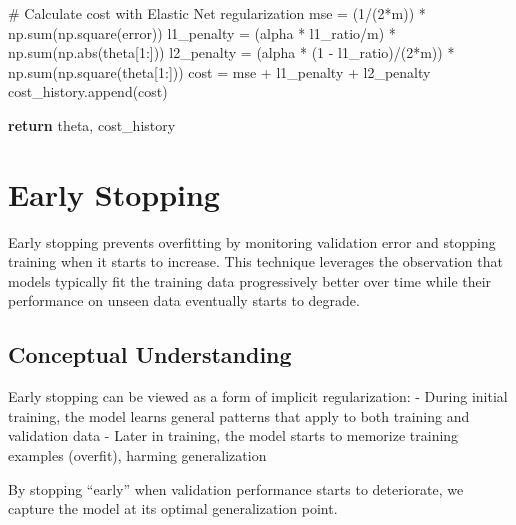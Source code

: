 \documentclass[
  letterpaper,
  DIV=11,
  numbers=noendperiod]{scrreprt}
\newenvironment{Shaded}{\begin{snugshade}}{\end{snugshade}}
\newcommand{\BuiltInTok}[1]{\textcolor[rgb]{0.00,0.23,0.31}{#1}}
\newcommand{\CommentTok}[1]{\textcolor[rgb]{0.37,0.37,0.37}{#1}}
\newcommand{\ControlFlowTok}[1]{\textcolor[rgb]{0.00,0.23,0.31}{\textbf{#1}}}
\newcommand{\DecValTok}[1]{\textcolor[rgb]{0.68,0.00,0.00}{#1}}
\newcommand{\NormalTok}[1]{\textcolor[rgb]{0.00,0.23,0.31}{#1}}
\newcommand{\OperatorTok}[1]{\textcolor[rgb]{0.37,0.37,0.37}{#1}}
\begin{document}
\begin{Shaded}
\begin{Highlighting}[]
        \CommentTok{\# Calculate cost with Elastic Net regularization}
\NormalTok{        mse }\OperatorTok{=}\NormalTok{ (}\DecValTok{1}\OperatorTok{/}\NormalTok{(}\DecValTok{2}\OperatorTok{*}\NormalTok{m)) }\OperatorTok{*}\NormalTok{ np.}\BuiltInTok{sum}\NormalTok{(np.square(error))}
\NormalTok{        l1\_penalty }\OperatorTok{=}\NormalTok{ (alpha }\OperatorTok{*}\NormalTok{ l1\_ratio}\OperatorTok{/}\NormalTok{m) }\OperatorTok{*}\NormalTok{ np.}\BuiltInTok{sum}\NormalTok{(np.}\BuiltInTok{abs}\NormalTok{(theta[}\DecValTok{1}\NormalTok{:]))}
\NormalTok{        l2\_penalty }\OperatorTok{=}\NormalTok{ (alpha }\OperatorTok{*}\NormalTok{ (}\DecValTok{1} \OperatorTok{{-}}\NormalTok{ l1\_ratio)}\OperatorTok{/}\NormalTok{(}\DecValTok{2}\OperatorTok{*}\NormalTok{m)) }\OperatorTok{*}\NormalTok{ np.}\BuiltInTok{sum}\NormalTok{(np.square(theta[}\DecValTok{1}\NormalTok{:]))}
\NormalTok{        cost }\OperatorTok{=}\NormalTok{ mse }\OperatorTok{+}\NormalTok{ l1\_penalty }\OperatorTok{+}\NormalTok{ l2\_penalty}
\NormalTok{        cost\_history.append(cost)}
        
    \ControlFlowTok{return}\NormalTok{ theta, cost\_history}
\end{Highlighting}
\end{Shaded}

\section{Early Stopping}\label{early-stopping}

Early stopping prevents overfitting by monitoring validation error and
stopping training when it starts to increase. This technique leverages
the observation that models typically fit the training data
progressively better over time while their performance on unseen data
eventually starts to degrade.

\subsection{Conceptual Understanding}\label{conceptual-understanding-4}

Early stopping can be viewed as a form of implicit regularization: -
During initial training, the model learns general patterns that apply to
both training and validation data - Later in training, the model starts
to memorize training examples (overfit), harming generalization

By stopping ``early'' when validation performance starts to deteriorate,
we capture the model at its optimal generalization point.
\end{document}

